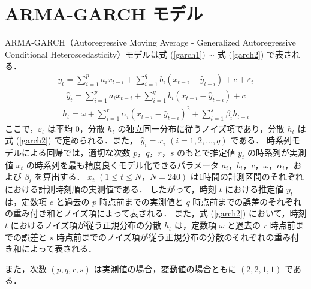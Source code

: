 \documentclass[a4j]{jarticle}
\begin{document}
\section{ARMA-GARCH モデル}
 ARMA-GARCH（Autoregressive Moving Average - Generalized Autoregressive Conditional Heteroscedasticity）モデルは式 (\ref{garch1}) $\sim$ 式 (\ref{garch2}) で表される．
\begin{eqnarray}
y_t = \sum_{i=1}^p a_i x_{t-i} + \sum_{i=1}^q b_i (x_{t-i} - \widehat{y}_{t-i}) + c + \varepsilon_{t} 
\label{garch1}
\end{eqnarray}
\begin{eqnarray}
\widehat{y}_t = \sum_{i=1}^p a_i x_{t-i} + \sum_{i=1}^q b_i (x_{t-i} - \widehat{y}_{t-i}) + c
\end{eqnarray}
\begin{eqnarray}
\displaystyle h_{t} = \omega + \sum_{i=1}^{r}\alpha_i(x_{t-i} - \widehat{y}_{t-i})^2 + \sum_{i=1}^{s}\beta_ih_{t-i}
\label{garch2}
\end{eqnarray}
ここで，$\varepsilon_t$ は平均 0，分散 $h_t$ の独立同一分布に従うノイズ項であり，分散 $h_t$ は式 (\ref{garch2}) で定められる．また， $\widehat{y}_i = x_i$ $(i = 1,2,\ldots,q)$ である．
時系列モデルによる回帰では，適切な次数 $p，q，r，s$ のもとで推定値 $y_t$ の時系列が実測値 $x_t$ の時系列を最も精度良くモデル化できるパラメータ $a_i，b_i，c，\omega，\alpha_i，$および $\beta_i$ を算出する．
$x_t$ $(1\leq t\leq N，N=240)$ は1時間の計測区間のそれぞれにおける計測時刻順の実測値である．
したがって，時刻 $t$ における推定値 $y_t$ は，定数項 $c$ と過去の $p$ 時点前までの実測値と $q$ 時点前までの誤差のそれぞれの重み付き和とノイズ項によって表される．
また，式 (\ref{garch2}) において，時刻 $t$ におけるノイズ項が従う正規分布の分散 $h_t$ は，定数項 $\omega$ と過去の $r$ 時点前までの誤差と $s$ 時点前までのノイズ項が従う正規分布の分散のそれぞれの重み付き和によって表される．

また，次数 $(p,q,r,s)$ は実測値の場合，変動値の場合ともに $(2,2,1,1)$ である．
\end{document}
